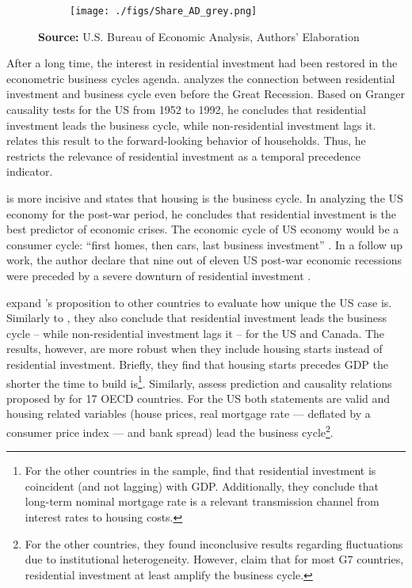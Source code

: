\documentclass[12pt, a4paper]{article}
\begin{document}
\begin{figure}[H]
    \centering
	\caption{Expenditures share on aggregate demand}
	\label{fig:share}
\begin{figure}[htb]
    \texttt{[image: ./figs/Share\_AD\_grey.png]}
    \end{figure}
	\caption*{\textbf{Source:} U.S. Bureau of Economic Analysis, Authors' Elaboration}
\end{figure}

After a long time, the interest in residential investment had been restored in the econometric business cycles agenda.
\textcite{green_follow_1997} analyzes the connection between residential investment and business cycle even before the Great Recession.
Based on Granger causality tests for the US from 1952 to 1992, he concludes that residential investment leads the business cycle, while non-residential investment lags it.
\textcite{green_follow_1997} relates this result to the forward-looking behavior of households.
Thus, he restricts the relevance of residential investment as a temporal precedence indicator.

\textcite{leamer_housing_2007} is more incisive and states that housing is the business cycle.
In analyzing the US economy for the post-war period, he concludes that residential investment is the best predictor of economic crises.
The economic cycle of US economy would be a consumer cycle: ``first homes, then cars, last business investment'' \cite[p.~8]{leamer_housing_2007}.
In a follow up work, the author declare that nine out of eleven US post-war economic recessions were preceded by a severe downturn of residential investment \cite{leamer_housing_2015}.

\textcite{kydland_2016_housing} expand \citeauthor*{leamer_housing_2007}'s \citeyear{leamer_housing_2007} proposition to other countries to evaluate how unique the US case is.
Similarly to \textcite{green_follow_1997}, they also conclude that residential investment leads the business cycle -- while non-residential investment lags it -- for the US and Canada.
The results, however, are more robust when they include housing starts instead of residential investment.
Briefly, they find that housing starts precedes GDP the shorter the time to build is\footnote{For the other countries in the sample, \textcite{kydland_2016_housing} find that residential investment is coincident (and not lagging) with GDP. Additionally, they conclude that long-term nominal mortgage rate is a relevant transmission channel from interest rates to housing costs.}.
Similarly, \textcite{huang_is_2018} assess  prediction and causality relations proposed by \textcite{leamer_housing_2007} for 17 OECD countries.
For the US both statements are valid and housing related variables (house prices, real mortgage rate --- deflated by a consumer price index --- and bank spread) lead the business cycle\footnote{For the other countries, they found inconclusive results regarding fluctuations due to institutional heterogeneity. However, \textcite{huang_is_2018} claim that for most G7 countries, residential investment at least amplify the business cycle.}.
\end{document}
